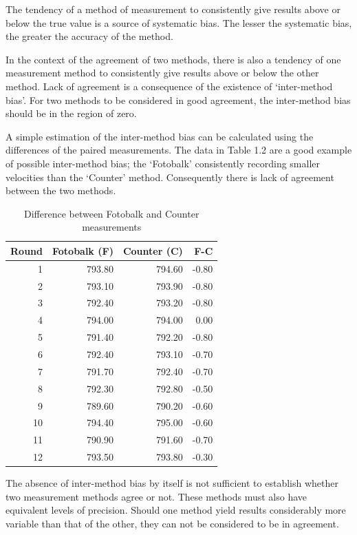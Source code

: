 \documentclass[Chap1main.tex]{subfiles}
\begin{document}
The tendency of a method of measurement to consistently give
results above or below the true value is a source of systematic
bias. The lesser the systematic bias, the greater the accuracy of
the method.

In the context of the agreement of two methods, there is also a
tendency of one measurement method to consistently give results
above or below the other method. Lack of agreement is a
consequence of the existence of `inter-method bias'. For two
methods to be considered in good agreement, the inter-method bias
should be in the region of zero.

A simple estimation of the inter-method bias can be calculated
using the differences of the paired measurements. The data in
Table 1.2 are a good example of possible inter-method bias; the
`Fotobalk' consistently recording smaller velocities than the
`Counter' method. Consequently there is lack of agreement between
the two methods.
\newpage
\begin{table}[h!]
\begin{center}

\begin{tabular}{rrrr}
  \hline
 Round& Fotobalk (F) & Counter (C) & F-C \\
  \hline
1 & 793.80 & 794.60 & -0.80 \\
  2 & 793.10 & 793.90 & -0.80 \\
  3 & 792.40 & 793.20 & -0.80 \\
  4 & 794.00 & 794.00 & 0.00 \\
  5 & 791.40 & 792.20 & -0.80 \\
  6 & 792.40 & 793.10 & -0.70 \\
  7 & 791.70 & 792.40 & -0.70 \\
  8 & 792.30 & 792.80 & -0.50 \\
  9 & 789.60 & 790.20 & -0.60 \\
  10 & 794.40 & 795.00 & -0.60 \\
  11 & 790.90 & 791.60 & -0.70 \\
  12 & 793.50 & 793.80 & -0.30 \\
   \hline
\end{tabular}
\caption{Difference between Fotobalk and Counter measurements}
\end{center}
\end{table}

\bigskip

\noindent The absence of inter-method bias by itself is not
sufficient to establish whether two measurement methods agree or
not. These methods must also have equivalent levels of precision.
Should one method yield results considerably more variable than
that of the other, they can not be considered to be in agreement.
\end{document}
